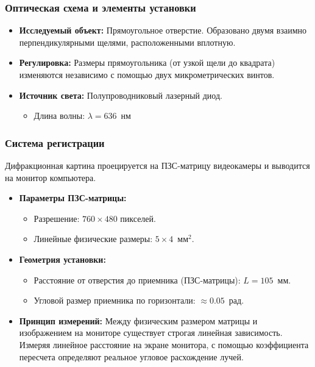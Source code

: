 \documentclass[12pt,a5paper,titlepage, main = russian]{article}
\begin{document}
\subsubsection{Оптическая схема и элементы установки}
\begin{itemize}
    \item \textbf{Исследуемый объект:} Прямоугольное отверстие. Образовано двумя взаимно перпендикулярными щелями, расположенными вплотную. 
    \item \textbf{Регулировка:} Размеры прямоугольника (от узкой щели до квадрата) изменяются независимо с помощью двух микрометрических винтов.
    \item \textbf{Источник света:} Полупроводниковый лазерный диод. 
    \begin{itemize}
        \item Длина волны: $\lambda = 636$~нм
    \end{itemize}
\end{itemize}

\subsubsection{Система регистрации}
Дифракционная картина проецируется на ПЗС-матрицу видеокамеры и выводится на монитор компьютера.
\begin{itemize}
    \item \textbf{Параметры ПЗС-матрицы:}
    \begin{itemize}
        \item Разрешение: $760 \times 480$ пикселей.
        \item Линейные физические размеры: $5 \times 4$~мм$^2$.
    \end{itemize}
    \item \textbf{Геометрия установки:}
    \begin{itemize}
        \item Расстояние от отверстия до приемника (ПЗС-матрицы): $L = 105$~мм.
        \item Угловой размер приемника по горизонтали: $\approx 0.05$~рад.
    \end{itemize}
    \item \textbf{Принцип измерений:} Между физическим размером матрицы и изображением на мониторе существует строгая линейная зависимость. Измеряя линейное расстояние на экране монитора, с помощью коэффициента пересчета определяют реальное угловое расхождение лучей.
\end{itemize}
\end{document}
